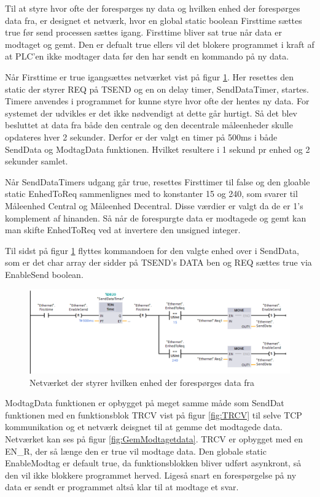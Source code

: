 Til at styre hvor ofte der forespørges ny data og hvilken enhed der forespørges data fra, er designet et netværk, hvor en global static boolean Firsttime sættes true før send processen sættes igang. Firsttime bliver sat true når data er modtaget og gemt. Den er defualt true ellers vil det blokere programmet i kraft af at PLC'en ikke modtager data før den har sendt en kommando på ny data.

Når Firsttime er true igangsættes netværket vist på figur \ref{fig:ValgAfEnhedSend}. Her resettes den static der styrer REQ på TSEND og en on delay timer, SendDataTimer, startes. Timere anvendes i programmet for kunne styre hvor ofte der hentes ny data. For systemet der udvikles er det ikke nødvendigt at dette går hurtigt. Så det blev besluttet at data fra både den centrale og den decentrale måleenheder skulle opdateres hver 2 sekunder. Derfor er der valgt en timer på 500ms i både SendData og ModtagData funktionen. Hvilket resultere i 1 sekund pr enhed og 2 sekunder samlet.

Når SendDataTimers udgang går true, resettes Firsttimer til false og den gloable static EnhedToReq sammenlignes med to konstanter 15 og 240, som svarer til Måleenhed Central og Måleenhed Decentral. Disse værdier er valgt da de er 1's komplement af hinanden. Så når de forespurgte data er modtagede og gemt kan man skifte EnhedToReq ved at invertere den unsigned integer.


Til sidst på figur \ref{fig:ValgAfEnhedSend} flyttes kommandoen for den valgte enhed over i SendData, som er det char array der sidder på TSEND's DATA ben og REQ sættes true via EnableSend boolean.

\begin{figure}[H] %
	\centering
	\includegraphics[width=1\textwidth]{Figure/valgAfEnhedSend}
	\caption{Netværket der styrer hvilken enhed der forespørges data fra}
	\label{fig:ValgAfEnhedSend}
\end{figure}

ModtagData funktionen er opbygget på meget samme måde som SendDat funktionen med en funktionsblok TRCV vist på figur \ref{fig:TRCV} til selve TCP kommunikation og et netværk deisgnet til at gemme det modtagede data. Netværket kan ses på figur \ref{fig:GemModtagetdata}. TRCV er opbygget med en EN\_R, der så længe den er true vil modtage data. Den globale static EnableModtag er default true, da funktionsblokken bliver udført asynkront, så den vil ikke blokkere programmet herved. Ligeså snart en forespørgelse på ny data er sendt er programmet altså klar til at modtage et svar.

